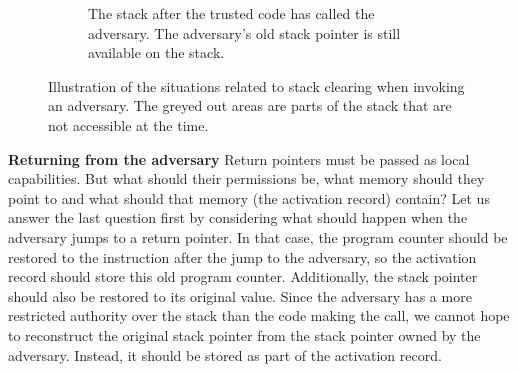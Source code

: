 \documentclass[format=acmsmall, review=true, screen=true]{acmart}
\begin{document}
\begin{figure}[htb]
\begin{subfigure}[t]{0.3\linewidth}
  \caption{The stack after the trusted code has called the adversary. The
    adversary's old stack pointer is still available on the stack.}
  \label{fig:illu-adv-called}
  \end{subfigure}
  \caption{Illustration of the situations related to stack clearing when invoking an adversary.
    The greyed out areas are parts of the stack that are not accessible at the time.
  }
  \label{fig:invoke-adv}
\end{figure}

\textbf{Returning from the adversary} Return pointers must be passed as local
capabilities. But what should their permissions be, what memory should they
point to and what should that memory (the activation record) contain? Let us
answer the last question first by considering what should happen when the
adversary jumps to a return pointer. In that case, the program counter should be
restored to the instruction after the jump to the adversary, so the activation
record should store this old program counter. Additionally, the stack pointer
should also be restored to its original value. Since the adversary has a more
restricted authority over the stack than the code making the call, we cannot
hope to reconstruct the original stack pointer from the stack pointer owned by the
adversary. Instead, it should be stored as part of the activation record.
\end{document}
